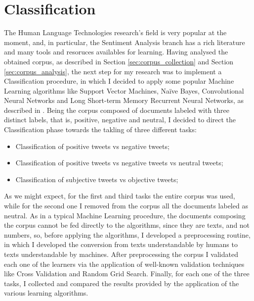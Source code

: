 \documentclass[11pt,twocolumn]{article}
\begin{document}
    \section{Classification} %
    \label{sec:classification}
        The Human Language Technologies research's field is very popular at the moment, and, in particular, the
        Sentiment Analysis branch has a rich literature and many tools and resoruces availables for learning.
        Having analysed the obtained corpus, as described in Section \ref{sec:corpus_collection} and Section
        \ref{sec:corpus_analysis}, the next step for my research was to implement a Classification procedure,
        in which I decided to apply some popular Machine Learning algorithms like Support Vector Machines,
        Naïve Bayes, Convolutional Neural Networks and Long Short-term Memory Recurrent Neural Networks, as
        described in \cite{semeval_2014,state_of_the_art,semeval_2016,esuli,attardi}. Being the corpus composed
        of documents labeled with three distinct labels, that is, positive, negative and neutral, I decided to
        direct the Classification phase towards the takling of three different tasks:

        \begin{itemize}
            \item Classification of positive tweets vs negative tweets;
            \item Classification of positive tweets vs negative tweets vs neutral tweets;
            \item Classification of subjective tweets vs objective tweets;
        \end{itemize}

        \noindent
        As we might expect, for the first and third tasks the entire corpus was used, while for the second one
        I removed from the corpus all the documents labeled as neutral. As in a typical Machine Learning
        procedure, the documents composing the corpus cannot be fed directly to the algorithms, since they are
        texts, and not numbers, so, before applying the algorithms, I developed a preprocessing routine, in
        which I developed the conversion from texts understandable by humans to texts understandable by
        machines. After preprocessing the corpus I validated each one of the learners via the application of
        well-known validation techniques like Cross Validation and Random Grid Search. Finally, for each one
        of the three tasks, I collected and compared the results provided by the application of the
        various learning algorithms.
\end{document}

